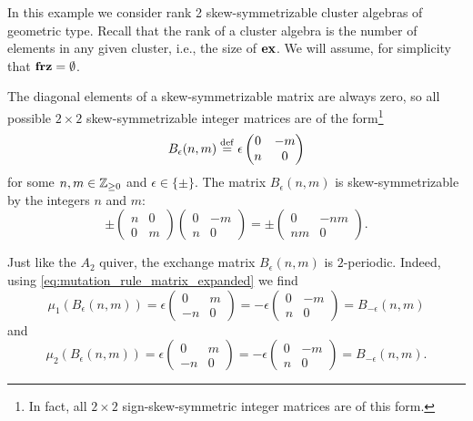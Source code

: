 \begin{example}

	In this example we consider rank 2 skew-symmetrizable cluster algebras of geometric
	type. Recall that the rank of a
	cluster algebra is the number of elements in any given cluster, i.e., the size of
	$\mathbf{ex}$. We will assume, for simplicity that $\mathbf{frz} = \emptyset$.

	The diagonal elements of a skew-symmetrizable matrix are always zero, so all possible
	$2\times2$ skew-symmetrizable integer matrices are of the form\footnote{In fact, all
		$2\times 2$ sign-skew-symmetric integer matrices are of this form.}
	\begin{equation*}
		B_\epsilon(n,m) \overset{\mathrm{def}}{=} \epsilon\begin{pmatrix}
			0 & -m \\
			n & 0
		\end{pmatrix}
	\end{equation*}
	for some $n,m \in \mathbb{Z}_{\geq 0}$ and $\epsilon \in \{\pm\}$. The matrix $B_\epsilon(n,
		m)$ is skew-symmetrizable by the integers $n$ and $m$:
	\begin{equation*}
		\pm
		\begin{pmatrix}
			n & 0 \\
			0 & m
		\end{pmatrix}
		\begin{pmatrix}
			0 & -m \\
			n & 0
		\end{pmatrix}
		= \pm \begin{pmatrix}
			0  & -nm \\
			nm & 0
		\end{pmatrix}.
	\end{equation*}

	Just like the $A_2$ quiver, the exchange matrix $B_\epsilon(n,m)$ is $2$-periodic.
	Indeed, using \cref{eq:mutation_rule_matrix_expanded} we find
	\begin{equation*}
		\mu_1(B_\epsilon(n,m)) = \epsilon\begin{pmatrix}
			0  & m \\
			-n & 0
		\end{pmatrix}
		= -\epsilon \begin{pmatrix}
			0 & -m \\
			n & 0
		\end{pmatrix}
		= B_{-\epsilon}(n, m)
	\end{equation*}
	and
	\begin{equation*}
		\mu_2(B_\epsilon(n,m)) = \epsilon\begin{pmatrix}
			0  & m \\
			-n & 0
		\end{pmatrix}
		= -\epsilon \begin{pmatrix}
			0 & -m \\
			n & 0
		\end{pmatrix}
		=  B_{-\epsilon}(n,m).
	\end{equation*}


\end{example}
